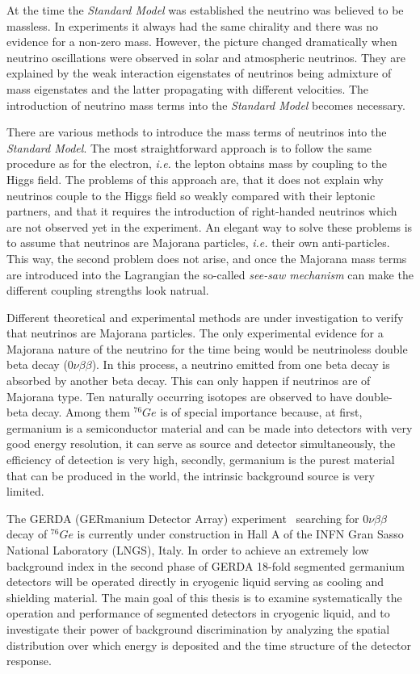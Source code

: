 At the time the \emph{Standard Model} was established the neutrino was
believed to be massless. In experiments it always had the same
chirality and there was no evidence for a non-zero mass. However, the
picture changed dramatically when neutrino oscillations were observed
in solar and atmospheric neutrinos. They are explained by the weak
interaction eigenstates of neutrinos being admixture of mass
eigenstates and the latter propagating with different velocities. The
introduction of neutrino mass terms into the \emph{Standard Model}
becomes necessary.

There are various methods to introduce the mass terms of neutrinos
into the \emph{Standard Model}. The most straightforward approach is
to follow the same procedure as for the electron, \textit{i.e.} the
lepton obtains mass by coupling to the Higgs field. The problems of
this approach are, that it does not explain why neutrinos couple to
the Higgs field so weakly compared with their leptonic partners, and
that it requires the introduction of right-handed neutrinos which are
not observed yet in the experiment. An elegant way to solve these
problems is to assume that neutrinos are Majorana particles,
\textit{i.e.} their own anti-particles. This way, the second problem
does not arise, and once the Majorana mass terms are introduced into
the Lagrangian the so-called \emph{see-saw mechanism} can make the
different coupling strengths look natrual.

Different theoretical and experimental methods are under investigation to verify that neutrinos are Majorana particles. The only experimental evidence for a Majorana nature of the neutrino for the time being would be neutrinoless double beta decay ($0\nu\beta\beta$). In this process, a neutrino emitted from one beta decay is absorbed by another beta decay. This can only happen if neutrinos are of Majorana type. Ten naturally occurring isotopes are observed to have double-beta decay. Among them $^{76}Ge$ is of special importance because, at first, germanium is a semiconductor material and can be made into detectors with very good energy resolution, it can serve as source and detector simultaneously, the efficiency of detection is very high, secondly, germanium is the purest material that can be produced in the world, the intrinsic background source is very limited.

The GERDA (GERmanium Detector Array) experiment~\cite{Sch05} searching for $0\nu\beta\beta$ decay of $^{76}Ge$ is currently under construction in Hall A of the INFN Gran Sasso National Laboratory (LNGS), Italy. In order to achieve an extremely low background index in the second phase of GERDA 18-fold segmented germanium detectors will be operated directly in cryogenic liquid serving as cooling and shielding material. The main goal of this thesis is to examine systematically the operation and performance of segmented detectors in cryogenic liquid, and to investigate their power of background discrimination by analyzing the spatial distribution over which energy is deposited and the time structure of the detector response.

